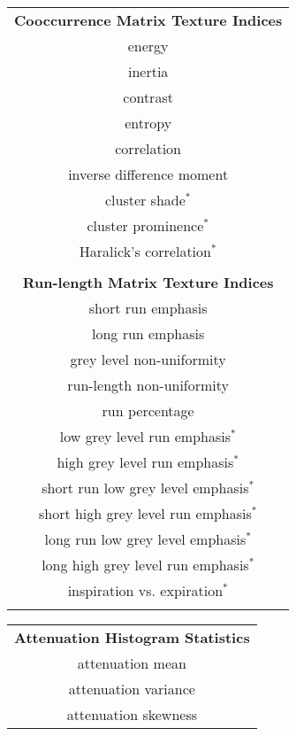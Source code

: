\begin{table}[!t]
\begin{minipage}{0.33 \linewidth}
   \vspace{-8mm}
    \centering
    \begin{tabular}[t]{c}
    {\bf Cooccurrence Matrix Texture Indices}  \\
    \cmidrule[1pt](lr){1-1}
    energy  \\
    inertia  \\
    contrast  \\
    entropy  \\
    correlation  \\
    inverse difference moment \\
    cluster shade$^*$ \\
    cluster prominence$^*$ \\
    Haralick's correlation$^*$ \\
    \\
    {\bf Run-length Matrix Texture Indices}  {} \\
    \cmidrule[1pt](lr){1-1}
    short run emphasis  \\
    long run emphasis   \\
    grey level non-uniformity   \\
    run-length non-uniformity  \\
    run percentage  \\
    low grey level run emphasis$^*$ \\
    high grey level run emphasis$^*$ \\
    short run low grey level emphasis$^*$ \\
    short high grey level run emphasis$^*$ \\
    long run low grey level emphasis$^*$ \\
    long high grey level run emphasis$^*$ \\
    inspiration vs. expiration$^*$\\
    \\
    \end{tabular}
   \end{minipage}
  \hspace{0cm}
  \begin{minipage}{0.33 \linewidth}
   \vspace{0mm}
    \centering
    \begin{tabular}[t]{c}
    {\bf Attenuation Histogram Statistics}  \\
    \cmidrule[1pt](lr){1-1}
    attenuation mean  \\
    attenuation variance  \\
    attenuation skewness  \\

\end{tabular}
\end{minipage}
\end{table}
